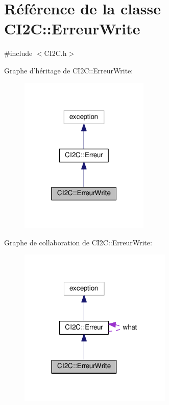 \hypertarget{class_c_i2_c_1_1_erreur_write}{\section{Référence de la classe C\+I2\+C\+:\+:Erreur\+Write}
\label{class_c_i2_c_1_1_erreur_write}
}


{\ttfamily \#include $<$C\+I2\+C.\+h$>$}



Graphe d'héritage de C\+I2\+C\+:\+:Erreur\+Write\+:
\nopagebreak
\begin{figure}[H]
\begin{center}
\leavevmode
\includegraphics[width=175pt]{class_c_i2_c_1_1_erreur_write__inherit__graph}
\end{center}
\end{figure}


Graphe de collaboration de C\+I2\+C\+:\+:Erreur\+Write\+:
\nopagebreak
\begin{figure}[H]
\begin{center}
\leavevmode
\includegraphics[width=206pt]{class_c_i2_c_1_1_erreur_write__coll__graph}
\end{center}
\end{figure}

